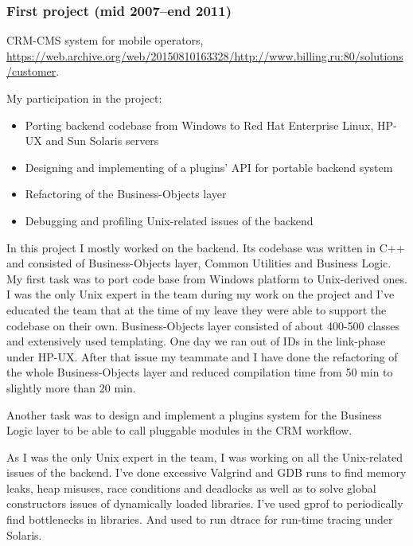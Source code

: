 \subsubsection*{First project (mid 2007--end 2011)}

CRM-CMS system for mobile operators,
\href{https://web.archive.org/web/20150810163328/http://www.billing.ru:80/solutions/customer}{\url{https://web.archive.org/web/20150810163328/http://www.billing.ru:80/solutions/customer}}.

My participation in the project:
\begin{itemize}[noitemsep, nosep]
  \item Porting backend codebase from Windows to Red Hat Enterprise
Linux, HP-UX and Sun Solaris servers
  \item Designing and implementing of a plugins' API for portable
backend system
  \item Refactoring of the Business-Objects layer
  \item Debugging and profiling Unix-related issues of the backend
\end{itemize}

In this project I mostly worked on the backend. Its codebase was
written in C++ and consisted of Business-Objects layer, Common
Utilities and Business Logic. My first task was to port code base from
Windows platform to Unix-derived ones. I was the only Unix expert in
the team during my work on the project and I've educated
the team that at the time of my leave they were able to support the codebase
on their own. Business-Objects layer consisted of about 400-500
classes and extensively used templating. One day we ran out of IDs in
the link-phase under HP-UX. After that issue my teammate and I have
done the refactoring of the whole Business-Objects layer and reduced
compilation time from 50 min to slightly more than 20 min.

Another task was to design and implement a plugins system for the
Business Logic layer to be able to call pluggable modules in the CRM
workflow.

As I was the only Unix expert in the team, I was working on all the
Unix-related issues of the backend. I've done excessive Valgrind and
GDB runs to find memory leaks, heap misuses, race conditions and
deadlocks as well as to solve global constructors issues of
dynamically loaded libraries.  I've used gprof to periodically find
bottlenecks in libraries. And used to run dtrace for run-time tracing
under Solaris.

